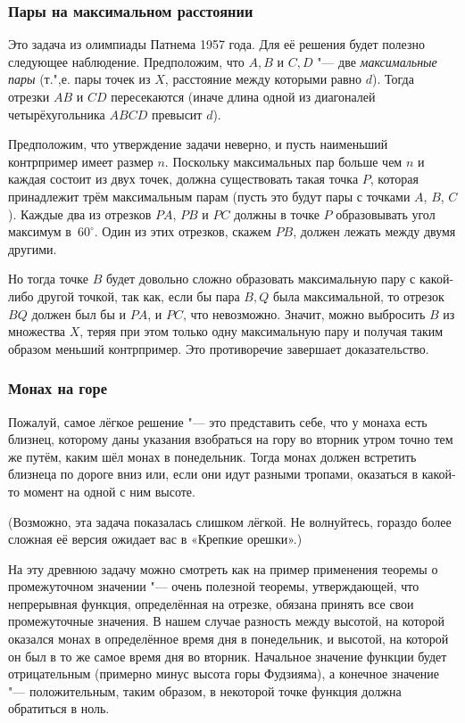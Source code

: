 \documentclass[twoside]{book}
\begin{document}
\subsubsection*{Пары на максимальном расстоянии}%

Это задача из олимпиады Патнема 1957 года.
Для её решения будет полезно следующее наблюдение.
Предположим, что $A,B$ и $C,D$ "--- две \emph{максимальные пары} (т.",е. пары точек из $X$, расстояние между которыми равно $d$).
Тогда отрезки $AB$ и $CD$ пересекаются (иначе длина одной из диагоналей четырёхугольника $ABCD$ превысит $d$).

Предположим, что утверждение задачи неверно, и пусть наименьший контрпример имеет размер $n$.
Поскольку максимальных пар больше чем $n$ и каждая состоит из двух точек,  должна существовать такая точка $P$, которая принадлежит трём максимальным парам (пусть это будут пары с точками $A$, $B$, $C$).
Каждые два из отрезков $PA$, $PB$ и $PC$ должны в точке $P$ образовывать угол максимум в~$60^\circ$.
Один из этих отрезков, скажем $PB$, %
должен лежать между двумя другими.

Но тогда точке $B$ будет довольно сложно образовать максимальную пару с какой-либо другой точкой, так как, если бы пара $B,Q$ была максимальной, то отрезок $BQ$ должен был бы  и $PA$, и $PC$, что невозможно.
Значит, можно выбросить $B$ из множества $X$, теряя при этом только одну максимальную пару и получая таким образом меньший контрпример.
Это противоречие завершает доказательство.\heart

\subsubsection*{Монах на горе}%

Пожалуй, самое лёгкое решение "--- это представить себе, что у монаха есть близнец, которому даны указания взобраться на гору во вторник утром точно тем же путём, каким шёл монах в понедельник.
Тогда монах должен встретить близнеца по дороге вниз или, если они идут разными тропами, оказаться в какой-то момент на одной с ним высоте.\heart

(Возможно, эта задача показалась слишком лёгкой.
Не волнуйтесь, гораздо более сложная её версия ожидает вас в  «Крепкие орешки».)

На эту древнюю задачу можно смотреть как на пример применения теоремы о промежуточном значении "--- очень полезной теоремы, утверждающей, что непрерывная функция, определённая на отрезке, обязана принять все свои промежуточные значения.
В нашем случае  разность между высотой, на которой оказался монах в определённое время дня в понедельник, и высотой, на которой он был в то же самое время дня во вторник.
Начальное значение функции будет отрицательным (примерно минус высота горы Фудзияма), а конечное значение "--- положительным, таким образом, в некоторой точке функция должна обратиться в ноль.
\end{document}
